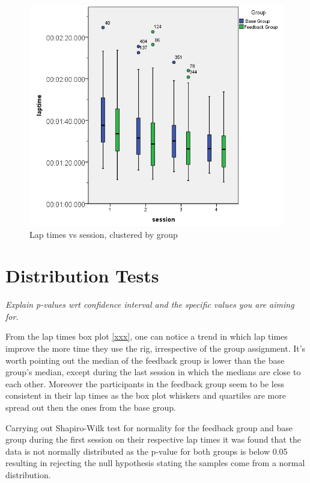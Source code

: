 \begin{figure}[!htb]
	\centering
	\includegraphics[width=\textwidth]{charts/laptimes.png}
	\caption{Lap times vs session, clustered by group}
	\label{fig:chart-laptimes}
\end{figure}

\section{Distribution Tests}
\label{sec:eval-distTests}
\emph{Explain p-values wrt confidence interval and the specific values you are aiming for.}

From the lap times box plot \ref{xxx}, one can notice a trend in which lap times improve the more time they use the rig, irrespective of the group assignment. It's worth pointing out the median of the feedback group is lower than the base group's median, except during the last session in which the medians are close to each other. Moreover the participants in the feedback group seem to be less consistent in their lap times as the box plot whiskers and quartiles are more spread out then the ones from the base group.

Carrying out Shapiro-Wilk test for normality for the feedback group and base group during the first session on their respective lap times it was found that the data is not normally distributed as the p-value for both groups is below 0.05 resulting in rejecting the null hypothesis stating the samples come from a normal distribution.

